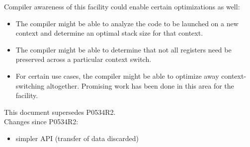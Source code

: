 \documentclass[fontsize=10pt,paper=A4,pagesize,DIV=15]{scrartcl}
\begin{document}
Compiler awareness of this facility could enable certain optimizations as
well:

\begin{itemize}
  \item The compiler might be able to analyze the code to be launched on a new
    \cc context and determine an optimal stack size for that context.
  \item The compiler might be able to determine that not all registers need be
    preserved across a particular context switch.
  \item For certain use cases, the compiler might be able to optimize away
    context-switching altogether. Promising work has been done in this area
    for the \coawait facility.\cite{N4649}
\end{itemize}

This document supersedes P0534R2.\cite{P0534R2}\\
\newline
Changes since P0534R2:

\begin{itemize}
    \item simpler API (transfer of data discarded)
\end{itemize}












\end{document}
